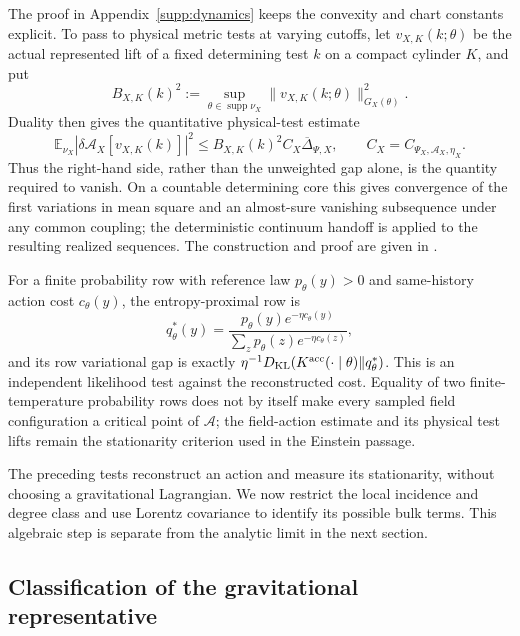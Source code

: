 \documentclass[11pt]{article}
\numberwithin{equation}{section}
\theoremstyle{definition}
\theoremstyle{remark}
\newcommand{\supp}{\operatorname{supp}}
\begin{document}
The proof in Appendix~\ref{supp:dynamics} keeps the convexity and chart
constants explicit.  To pass to physical metric tests at varying cutoffs, let
$v_{X,K}(k;\theta)$ be the actual represented lift of a fixed determining test
$k$ on a compact cylinder $K$, and put
\begin{equation}
 B_{X,K}(k)^2:=\sup_{\theta\in\supp\nu_X}
 \|v_{X,K}(k;\theta)\|_{G_X(\theta)}^2.
 \label{eq:main-test-lift-budget}
\end{equation}
Duality then gives the quantitative physical-test estimate
\begin{equation}
 \mathbb E_{\nu_X}
       |\delta\mathcal A_X[v_{X,K}(k)]|^2
       \le B_{X,K}(k)^2C_X\overline\Delta_{\Psi,X},
 \qquad C_X=C_{\Psi_X,\mathcal A_X,\eta_X}.
 \label{eq:main-physical-stationarity}
\end{equation}
Thus the right-hand side, rather than the unweighted gap alone, is the
quantity required to vanish.  On a countable determining core this gives
convergence of the first variations in mean square and an almost-sure
vanishing subsequence under any common coupling; the deterministic continuum
handoff is applied to the resulting realized sequences.  The construction and
proof are given in .

For a finite probability row with reference law $p_\theta(y)>0$ and
same-history action cost $c_\theta(y)$, the entropy-proximal row is
\begin{equation}
 q_\theta^*(y)=\frac{p_\theta(y)e^{-\eta c_\theta(y)}}
                    {\sum_zp_\theta(z)e^{-\eta c_\theta(z)}},
 \label{eq:main-gibbs-row}
\end{equation}
and its row variational gap is exactly
$\eta^{-1}D_{\rm KL}(K^{\rm acc}(\cdot\mid\theta)\Vert q_\theta^*)$.
This is an independent likelihood test against the reconstructed cost.
Equality of two finite-temperature probability rows does not by itself make
every sampled field configuration a critical point of $\mathcal A$; the
field-action estimate and its physical test lifts remain the stationarity
criterion used in the Einstein passage.

The preceding tests reconstruct an action and measure its stationarity,
without choosing a gravitational Lagrangian. We now restrict the local
incidence and degree class and use Lorentz covariance to identify its
possible bulk terms. This algebraic step is separate from the analytic
limit in the next section.

\subsection{Classification of the gravitational representative}
\end{document}
